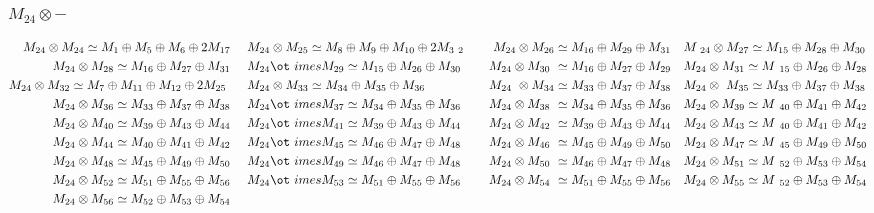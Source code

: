 \subsubsection{$M_24\otimes -$}
\begin{align*}
M_{24} \otimes M_{24} \simeq M_{1} \oplus M_{5} \oplus M_{6} \oplus 2 M_{17} &\
&& M_{24} \otimes M_{25} \simeq M_{8} \oplus M_{9} \oplus M_{10} \oplus 2 M_{3\
2} &&& M_{24} \otimes M_{26} \simeq M_{16} \oplus M_{29} \oplus M_{31} &&& M_{\
24} \otimes M_{27} \simeq M_{15} \oplus M_{28} \oplus M_{30}\\
M_{24} \otimes M_{28} \simeq M_{16} \oplus M_{27} \oplus M_{31} &&& M_{24} \ot\
imes M_{29} \simeq M_{15} \oplus M_{26} \oplus M_{30} &&& M_{24} \otimes M_{30\
} \simeq M_{16} \oplus M_{27} \oplus M_{29} &&& M_{24} \otimes M_{31} \simeq M\
_{15} \oplus M_{26} \oplus M_{28}\\
M_{24} \otimes M_{32} \simeq M_{7} \oplus M_{11} \oplus M_{12} \oplus 2 M_{25}\
 &&& M_{24} \otimes M_{33} \simeq M_{34} \oplus M_{35} \oplus M_{36} &&& M_{24\
} \otimes M_{34} \simeq M_{33} \oplus M_{37} \oplus M_{38} &&& M_{24} \otimes \
M_{35} \simeq M_{33} \oplus M_{37} \oplus M_{38}\\
M_{24} \otimes M_{36} \simeq M_{33} \oplus M_{37} \oplus M_{38} &&& M_{24} \ot\
imes M_{37} \simeq M_{34} \oplus M_{35} \oplus M_{36} &&& M_{24} \otimes M_{38\
} \simeq M_{34} \oplus M_{35} \oplus M_{36} &&& M_{24} \otimes M_{39} \simeq M\
_{40} \oplus M_{41} \oplus M_{42}\\
M_{24} \otimes M_{40} \simeq M_{39} \oplus M_{43} \oplus M_{44} &&& M_{24} \ot\
imes M_{41} \simeq M_{39} \oplus M_{43} \oplus M_{44} &&& M_{24} \otimes M_{42\
} \simeq M_{39} \oplus M_{43} \oplus M_{44} &&& M_{24} \otimes M_{43} \simeq M\
_{40} \oplus M_{41} \oplus M_{42}\\
M_{24} \otimes M_{44} \simeq M_{40} \oplus M_{41} \oplus M_{42} &&& M_{24} \ot\
imes M_{45} \simeq M_{46} \oplus M_{47} \oplus M_{48} &&& M_{24} \otimes M_{46\
} \simeq M_{45} \oplus M_{49} \oplus M_{50} &&& M_{24} \otimes M_{47} \simeq M\
_{45} \oplus M_{49} \oplus M_{50}\\
M_{24} \otimes M_{48} \simeq M_{45} \oplus M_{49} \oplus M_{50} &&& M_{24} \ot\
imes M_{49} \simeq M_{46} \oplus M_{47} \oplus M_{48} &&& M_{24} \otimes M_{50\
} \simeq M_{46} \oplus M_{47} \oplus M_{48} &&& M_{24} \otimes M_{51} \simeq M\
_{52} \oplus M_{53} \oplus M_{54}\\
M_{24} \otimes M_{52} \simeq M_{51} \oplus M_{55} \oplus M_{56} &&& M_{24} \ot\
imes M_{53} \simeq M_{51} \oplus M_{55} \oplus M_{56} &&& M_{24} \otimes M_{54\
} \simeq M_{51} \oplus M_{55} \oplus M_{56} &&& M_{24} \otimes M_{55} \simeq M\
_{52} \oplus M_{53} \oplus M_{54}\\
M_{24} \otimes M_{56} \simeq M_{52} \oplus M_{53} \oplus M_{54}\\
\end{align*}

